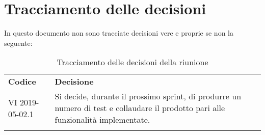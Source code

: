 \clearpage
\section{Tracciamento delle decisioni}
In questo documento non sono tracciate decisioni vere e proprie se non la seguente:
\begin{center}
	\renewcommand{\arraystretch}{1.5}
	\begin{longtable}{  p{2.8cm} p{11.4cm} }
		\rowcolor{tableHeadYellow}
		\textbf{Codice}&\textbf{Decisione}\\
		VI 2019-05-02.1 & Si decide, durante il prossimo sprint, di produrre un numero di test e collaudare il prodotto pari alle funzionalità implementate.\\
		\rowcolor{white}
		\caption{Tracciamento delle decisioni della riunione}
	\end{longtable}	
\end{center}